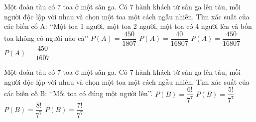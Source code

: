 \begin{ex}
Một đoàn tàu có 7 toa ở một sân ga. Có 7 hành khách từ sân ga lên tàu, mỗi người độc lập với nhau và chọn một toa một cách ngẫu nhiên. Tìm xác suất của các biến cố A: \lq\lq   Một toa 1 người, một toa 2 người, một toa có 4 người lên và bốn toa không có người nào cả\rq\rq 
\choice
{$P(A)=\dfrac{450}{1807}$}
{$P(A)=\dfrac{40}{16807}$ }
{\True $P(A)=\dfrac{450}{16807}$}
{$P(A)=\dfrac{450}{1607}$}
\end{ex}
\begin{ex}
Một đoàn tàu có 7 toa ở một sân ga. Có 7 hành khách từ sân ga lên tàu, mỗi người độc lập với nhau và chọn một toa một cách ngẫu nhiên. Tìm xác suất của các biến cố B: \lq\lq   Mỗi toa có đúng một người lên\rq\rq .
\choice
{$P(B)=\dfrac{6!}{7^7}$}
{$P(B)=\dfrac{5!}{7^7}$}
{$P(B)=\dfrac{8!}{7^7}$}
{\True $P(B)=\dfrac{7!}{7^7}$}
\end{ex}
